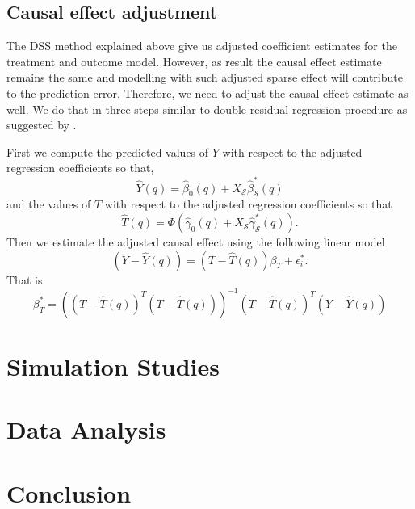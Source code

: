 \documentclass{amsart}
\begin{document}
\iftrue
\subsection{Causal effect adjustment} The DSS method explained
above give us adjusted coefficient estimates for the treatment
and outcome model. However, as result the causal effect estimate
remains the same and modelling with such adjusted sparse effect 
will contribute to the prediction error. Therefore, we need to 
adjust the causal effect estimate as well. We do that in three steps
similar to double residual regression procedure as suggested by
\citet{robinson1988}.

First we compute the predicted values of $Y$ with respect to
the adjusted regression coefficients so that,
\begin{equation}
\hat{Y}(q) 
= \hat{\beta}_0(q) + X_{\mathcal{S}}\hat{\beta}^*_{\mathcal{S}}(q)
\end{equation}
and the values of $T$ with respect to the adjusted
regression coefficients so that
\begin{equation}
\hat{T}(q) 
= \Phi\left(\hat{\gamma}_0(q) + X_{\mathcal{S}}\hat{\gamma}^*_{\mathcal{S}}(q)\right).
\end{equation}
Then we estimate the adjusted causal effect using the following linear
model
\begin{equation}
\left(Y-\hat{Y}(q)\right) = \left(T - \hat{T}(q)\right)\beta_{T} + \epsilon^*_i.
\end{equation}
That is 
\begin{equation}
\beta_{T}^* = \left(\left(T - \hat{T}(q)\right)^T\left(T - \hat{T}(q)\right)\right)^{-1}\left(T - \hat{T}(q)\right)^T\left(Y-\hat{Y}(q)\right)
\end{equation}

\fi


\section{Simulation Studies}\label{sec:sim}

\section{Data Analysis}\label{sec:data:analysis}

\section{Conclusion}\label{sec:conc}



\end{document}
